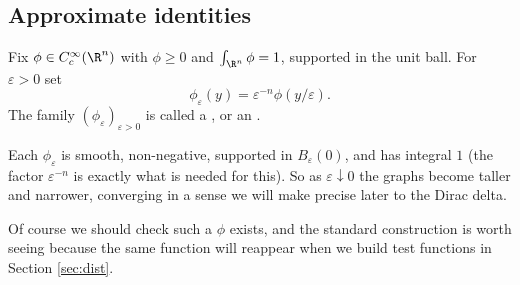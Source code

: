 \subsection{Approximate identities}

\begin{definition}[Mollifier]
	Fix $\phi \in C_c^\infty(\R^n)$ with $\phi \ge 0$ and $\int_{\R^n} \phi = 1$, supported in the unit ball. For $\varepsilon > 0$ set
	$$\phi_\varepsilon(y) = \varepsilon^{-n} \phi(y/\varepsilon).$$
	The family $(\phi_\varepsilon)_{\varepsilon>0}$ is called a , or an .
\end{definition}

Each $\phi_\varepsilon$ is smooth, non-negative, supported in $B_\varepsilon(0)$, and has integral $1$ (the factor $\varepsilon^{-n}$ is exactly what is needed for this). So as $\varepsilon \downarrow 0$ the graphs become taller and narrower, converging in a sense we will make precise later to the Dirac delta.

Of course we should check such a $\phi$ exists, and the standard construction is worth seeing because the same function will reappear when we build test functions in Section \ref{sec:dist}.

